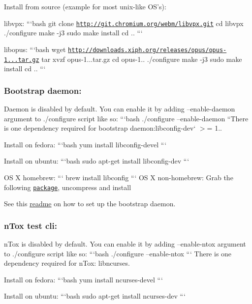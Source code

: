 Install from source (example for most unix-\/like O\+S's)\+:

libvpx\+: ```bash git clone \href{http://git.chromium.org/webm/libvpx.git}{\tt http\+://git.\+chromium.\+org/webm/libvpx.\+git} cd libvpx ./configure make -\/j3 sudo make install cd .. ```

libopus\+: ```bash wget \href{http://downloads.xiph.org/releases/opus/opus-1.0.3.tar.gz}{\tt http\+://downloads.\+xiph.\+org/releases/opus/opus-\/1...\+tar.\+gz} tar xvzf opus-\/1...\+tar.\+gz cd opus-\/1.. ./configure make -\/j3 sudo make install cd .. ```

\label{_bootstrapd}%
 \subsubsection*{Bootstrap daemon\+:}

Daemon is disabled by default. You can enable it by adding --enable-\/daemon argument to ./configure script like so\+: ```bash ./configure --enable-\/daemon ``{\ttfamily  There is one dependency required for bootstrap daemon\+:}libconfig-\/dev` $>$= 1..

Install on fedora\+: ```bash yum install libconfig-\/devel ```

Install on ubuntu\+: ```bash sudo apt-\/get install libconfig-\/dev ```

O\+S X homebrew\+: ``` brew install libconfig ``` O\+S X non-\/homebrew\+: Grab the following \href{http://www.hyperrealm.com/libconfig/}{\tt package}, uncompress and install

See this \hyperlink{md_other_bootstrap_daemon__r_e_a_d_m_e}{readme} on how to set up the bootstrap daemon.

\label{_ntox}%
 \subsubsection*{n\+Tox test cli\+:}

n\+Tox is disabled by default. You can enable it by adding --enable-\/ntox argument to ./configure script like so\+: ```bash ./configure --enable-\/ntox ``` There is one dependency required for n\+Tox\+: libncurses.

Install on fedora\+: ```bash yum install ncurses-\/devel ```

Install on ubuntu\+: ```bash sudo apt-\/get install ncurses-\/dev ``` 